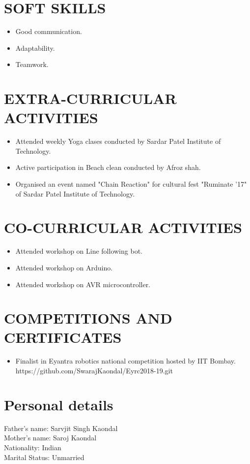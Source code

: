 \documentclass{article}
\begin{document}
\section*{\textbf{SOFT SKILLS}}
\begin{itemize}
\item Good communication.
\item Adaptability.
\item Teamwork.
\end{itemize}


\section*{\textbf{EXTRA-CURRICULAR ACTIVITIES}}
\begin{itemize}
\item Attended weekly Yoga clases conducted by Sardar Patel Institute of Technology. 
\item Active participation in Beach clean conducted by Afroz shah.
\item Organised an event named "Chain Reaction" for cultural fest "Ruminate '17" of Sardar Patel Institute of Technology.
\end{itemize}


\section*{\textbf{CO-CURRICULAR ACTIVITIES}}
\begin{itemize}
\item Attended workshop on Line following bot.
\item Attended workshop on Arduino.
\item Attended workshop on AVR microcontroller.
\end{itemize}

\section*{\textbf{COMPETITIONS AND CERTIFICATES}}
\begin{itemize}
\item Finalist in Eyantra robotics national competition hosted by IIT Bombay.\\https://github.com/SwarajKaondal/Eyrc2018-19.git
\end{itemize}


\section*{\textbf{Personal details}}
Father's name: Sarvjit Singh Kaondal\\
Mother's name: Saroj Kaondal\\
Nationality: Indian\\
Marital Status: Unmarried
\end{document}
